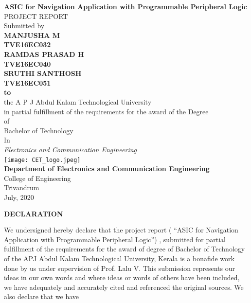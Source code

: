 \documentclass[12pt,a4paper]{report}
\begin{document}
\pagestyle{empty}
\begin{center}
{\Large \textbf{ASIC for Navigation Application with Programmable Peripheral Logic}}\\
\vspace{0.2cm}
PROJECT REPORT\\
\vspace{0.2cm}
Submitted by \\
\vspace{0.2cm}
\textbf{MANJUSHA M}\\
\textbf{TVE16EC032}\\
\vspace{0.12cm}
\textbf{RAMDAS PRASAD H}\\
\textbf{TVE16EC040}\\
\vspace{0.12cm}
\textbf{SRUTHI SANTHOSH}\\
\textbf{TVE16EC051}\\
\vspace{0.12cm}
\textbf{to}\\
\vspace{0.12cm}
the A P J Abdul Kalam Technological University \\
in partial fulfillment of the requirements for the award of the Degree \\
of\\
Bachelor of Technology \\
In\\
\textit{Electronics and Communication Engineering}\\
\texttt{[image: CET\_logo.jpeg]}\\
\textbf{Department of Electronics and Communication Engineering}\\
College of Engineering\\
Trivandrum\\
July, 2020
\end{center}
\newpage
\begin{center}
\textbf{\large DECLARATION}
\end{center}
We undersigned hereby declare that the project report ( “ASIC for Navigation Application with Programmable Peripheral Logic”) , submitted for partial fulfillment of the requirements for the award of degree of Bachelor of Technology of the APJ Abdul Kalam Technological University, Kerala is a bonafide work done by us under supervision of Prof. Lalu V. This submission represents our ideas in our own words and where ideas or words of others have been included, we have adequately and accurately cited and referenced the original sources. We also declare that we have
\end{document}
